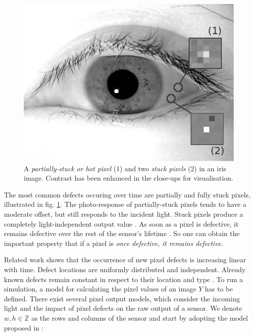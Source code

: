 \documentclass[10pt,twocolumn,letterpaper]{article}
\begin{document}
\begin{figure}
\centering
\includegraphics[width=0.7\linewidth]{img/defects.png}
\caption{A \emph{partially-stuck or hot pixel} (1) and two \emph{stuck pixels} (2) in an iris image. Contrast has been enhanced in the close-ups for visualisation.}
\label{fig:hotStuck}
\end{figure}

The most common defects occuring over time are partially and fully stuck pixels, illustrated in fig. \ref{fig:hotStuck}. The photo-response of partially-stuck pixels tends to have a moderate offset, but still responds to the incident light. Stuck pixels produce a completely light-independent output value \cite{fridrich}. As soon as a pixel is defective, it remains defective over the rest of the sensor's lifetime \cite{failureSemi}. So one can obtain the important property that if a pixel is \emph{once defective, it remains defective}.

Related work \cite{datingImages, inFieldDefects, defectDetection,failureSemi, defectIdentification, fridrich} shows that the occurrence of new pixel defects is increasing linear with time. Defect locations are uniformly distributed and independent. Already known defects remain constant in respect to their location and type . 
To run a simulation, a model for calculating the pixel values of an image $Y$ has to be defined. There exist several pixel output models, which consider the incoming light and the impact of pixel defects on the raw output of a sensor. We denote $w,h \in \mathbb{Z}$ as the rows and columns of the sensor and start by adopting the model proposed in \cite{fridrich}:
\end{document}
